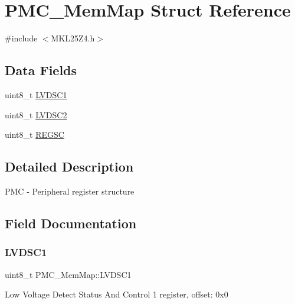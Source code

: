 \hypertarget{struct_p_m_c___mem_map}{}\section{P\+M\+C\+\_\+\+Mem\+Map Struct Reference}
\label{struct_p_m_c___mem_map}


{\ttfamily \#include $<$M\+K\+L25\+Z4.\+h$>$}

\subsection*{Data Fields}
\begin{DoxyCompactItemize}
\item 
uint8\+\_\+t \hyperlink{struct_p_m_c___mem_map_aeed619ce4a5bf17bff6201b02deebb54}{L\+V\+D\+S\+C1}
\item 
uint8\+\_\+t \hyperlink{struct_p_m_c___mem_map_a934db8b39dae8b99a9a9165df50145f5}{L\+V\+D\+S\+C2}
\item 
uint8\+\_\+t \hyperlink{struct_p_m_c___mem_map_aa14a55a46cc237589d6c01ebf7676c2a}{R\+E\+G\+SC}
\end{DoxyCompactItemize}


\subsection{Detailed Description}
P\+MC -\/ Peripheral register structure 

\subsection{Field Documentation}
\mbox{\label{struct_p_m_c___mem_map_aeed619ce4a5bf17bff6201b02deebb54}} 
\subsubsection{\texorpdfstring{L\+V\+D\+S\+C1}{LVDSC1}}
{\footnotesize\ttfamily uint8\+\_\+t P\+M\+C\+\_\+\+Mem\+Map\+::\+L\+V\+D\+S\+C1}

Low Voltage Detect Status And Control 1 register, offset\+: 0x0 \mbox{\label{struct_p_m_c___mem_map_a934db8b39dae8b99a9a9165df50145f5}} 
